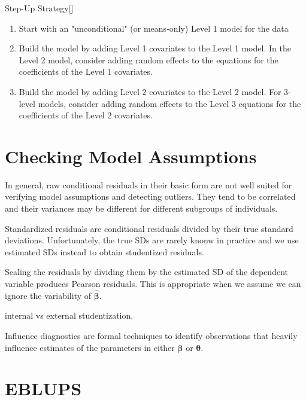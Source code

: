 \documentclass[english]{article}
\begin{document}
\begin{multicols*}{2}
\begin{definitionGENERAL}{Step-Up Strategy}[]
\begin{enumerate}
	\item	Start with an "unconditional" (or means-only) Level 1 model for the data
	\item	Build the model by adding Level 1 covariates to the Level 1 model. In the Level 2 model, consider adding random effects to the equations for the coefficients of the Level 1 covariates.
	\item	Build the model by adding Level 2 covariates to the Level 2 model. For 3-level models, consider adding random effects to the Level 3 equations for the coefficients of the Level 2 covariates.	
\end{enumerate}
\end{definitionGENERAL}

\section{Checking Model Assumptions}
In general, raw conditional residuals in their basic form are not well suited for verifying model assumptions and detecting outliers. They tend to be correlated and their variances may be different for different subgroups of individuals.

\bigskip

Standardized residuals are conditional residuals divided by their true standard deviations. Unfortunately, the true SDs are rarely knonw in practice and we use estimated SDs instead to obtain studentized residuals.

\bigskip

Scaling the residuals by dividing them by the estimated SD of the dependent variable produces Pearson residuals. This is appropriate when we assume we can ignore the variability of $\hat{\bm{\beta}}$. 

\bigskip

internal vs external studentization.

\bigskip

Influence diagnostics are formal techniques to identify observations that heavily influence estimates of the parameters in either $\bm{\beta}$ or $\bm{\theta}$.

\section{EBLUPS}


\end{multicols*}
\end{document}
